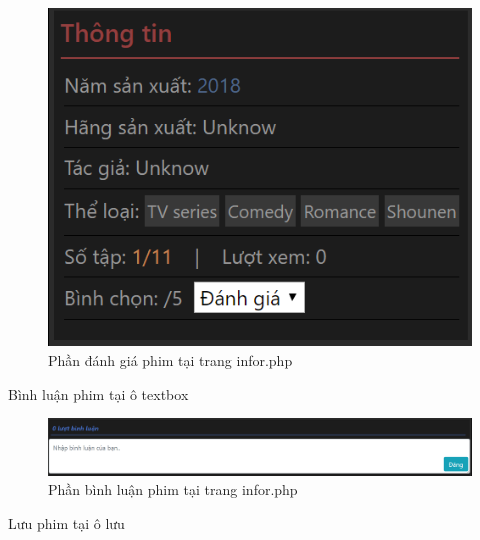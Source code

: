\documentclass{report}
\begin{document}
\begin{center}
    \begin{figure}[htp]
    \begin{center}
     \includegraphics[scale=0.8925]{5.png}
    \end{center}
    \caption{Phần đánh giá phim tại trang infor.php}
    \label{refhinh1}
    \end{figure}
\end{center}

\newpage
Bình luận phim tại ô textbox

\begin{center}
    \begin{figure}[htp]
    \begin{center}
     \includegraphics[scale=0.45]{6.png}
    \end{center}
    \caption{Phần bình luận phim tại trang infor.php}
    \label{refhinh1}
    \end{figure}
\end{center}

Lưu phim tại ô lưu
\end{document}
